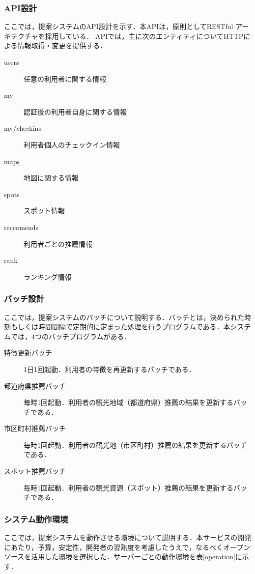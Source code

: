 \documentclass{jsarticle}
\begin{document}
\subsubsection{API設計}

ここでは，提案システムのAPI設計を示す．本APIは，原則としてRESTful アーキテクチャを採用している．
APIでは，主に次のエンティティについてHTTPによる情報取得・変更を提供する．

\begin{description}
    \item[users] 任意の利用者に関する情報
    \item[my] 認証後の利用者自身に関する情報
    \item[my/checkins] 利用者個人のチェックイン情報
    \item[maps] 地図に関する情報
    \item[spots] スポット情報
    \item[reccomends] 利用者ごとの推薦情報
    \item[rank] ランキング情報
\end{description}

\subsubsection{バッチ設計}

ここでは，提案システムのバッチについて説明する．バッチとは，決められた時刻もしくは時間間隔で定期的に定まった処理を行うプログラムである．本システムでは，4つのバッチプログラムがある．

\begin{description}
    \item[特徴更新バッチ] 1日1回起動．利用者の特徴を再更新するバッチである．
    \item[都道府県推薦バッチ] 毎時1回起動．利用者の観光地域（都道府県）推薦の結果を更新するバッチである．
    \item[市区町村推薦バッチ] 毎時1回起動．利用者の観光地（市区町村）推薦の結果を更新するバッチである．
    \item[スポット推薦バッチ] 毎時1回起動．利用者の観光資源（スポット）推薦の結果を更新するバッチである．
\end{description}

\subsubsection{システム動作環境}

ここでは，提案システムを動作させる環境について説明する．本サービスの開発にあたり，予算，安定性，開発者の習熟度を考慮したうえで，なるべくオープンソースを活用した環境を選択した．サーバーごとの動作環境を表\ref{operation}に示す．
\end{document}
